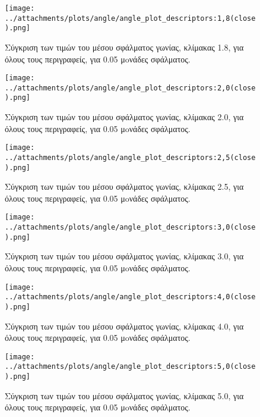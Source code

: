   
 \begin{figure}[ht!]
\begin{minipage}[b]{1.0\linewidth}
\centering
\texttt{[image: ../attachments/plots/angle/angle\_plot\_descriptors:1,8(close).png]}
\caption{Σύγκριση των τιμών του μέσου σφάλματος γωνίας, κλίμακας 1.8, για όλους τους περιγραφείς, για 0.05 μoνάδες σφάλματος.}
\label{fig:plot_scale_des_1.8_low}
\end{minipage}
 \end{figure} 
 \begin{figure}[ht!]
\begin{minipage}[b]{1.0\linewidth}
\centering
\texttt{[image: ../attachments/plots/angle/angle\_plot\_descriptors:2,0(close).png]}
\caption{Σύγκριση των τιμών του μέσου σφάλματος γωνίας, κλίμακας 2.0, για όλους τους περιγραφείς, για 0.05 μoνάδες σφάλματος.}
\label{fig:plot_scale_des_2.0_low}
\end{minipage}

 \end{figure} 
 
 \newpage
 
  
 \begin{figure}[ht!]
\begin{minipage}[b]{1.0\linewidth}
\centering
\texttt{[image: ../attachments/plots/angle/angle\_plot\_descriptors:2,5(close).png]}
\caption{Σύγκριση των τιμών του μέσου σφάλματος γωνίας, κλίμακας 2.5, για όλους τους περιγραφείς, για 0.05 μoνάδες σφάλματος.}
\label{fig:plot_scale_des_2.5_low}
\end{minipage}
 \end{figure} 
 \begin{figure}[ht!]
\begin{minipage}[b]{1.0\linewidth}
\centering
\texttt{[image: ../attachments/plots/angle/angle\_plot\_descriptors:3,0(close).png]}
\caption{Σύγκριση των τιμών του μέσου σφάλματος γωνίας, κλίμακας 3.0, για όλους τους περιγραφείς, για 0.05 μoνάδες σφάλματος.}
\label{fig:plot_scale_des_3.0_low}
\end{minipage} 
 \end{figure} 
 
\newpage

 \begin{figure}[ht!]
\begin{minipage}[b]{1.0\linewidth}
\centering
\texttt{[image: ../attachments/plots/angle/angle\_plot\_descriptors:4,0(close).png]}
\caption{Σύγκριση των τιμών του μέσου σφάλματος γωνίας, κλίμακας 4.0, για όλους τους περιγραφείς, για 0.05 μoνάδες σφάλματος.}
\label{fig:plot_scale_des_4.0_low}
\end{minipage}
 \end{figure} 
 \begin{figure}[ht!]
\begin{minipage}[b]{1.0\linewidth}
\centering
\texttt{[image: ../attachments/plots/angle/angle\_plot\_descriptors:5,0(close).png]}
\caption{Σύγκριση των τιμών του μέσου σφάλματος γωνίας, κλίμακας 5.0, για όλους τους περιγραφείς, για 0.05 μoνάδες σφάλματος.}
\label{fig:plot_scale_des_5.0_low}
\end{minipage}
 \end{figure} 
 
